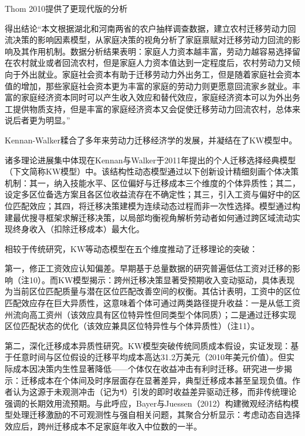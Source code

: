 \documentclass[a4paper,12pt]{article}
\begin{document}
Thom 2010提供了更现代版的分析

\cite{ShiZhiLeiJiaTingBingFuJiaTingJueCeYuNongCunQianYiLaoDongLiHuiLiu2012}得出结论“本文根据湖北和河南两省的农户抽样调查数据，建立农村迁移劳动力回流决策的影响因素模型，从家庭决策的视角分析了家庭禀赋对迁移劳动力回流的影响及其作用机制。数据分析结果表明：家庭人力资本越丰富，劳动力越容易选择留在农村就业或者回流农村，但是家庭人力资本值达到一定程度后，农村劳动力又倾向于外出就业。家庭社会资本有助于迁移劳动力外出务工，但是随着家庭社会资本值的增加，那些家庭社会资本更为丰富的家庭的劳动力则更愿意回流家乡就业。丰富的家庭经济资本同时可以产生收入效应和替代效应，家庭经济资本可以为外出务工提供物质支持，但是丰富的家庭经济资本又会促使迁移劳动力回流农村，总体来说后者更为明显。”

\cite{RenYuanNongCunWaiChuLaoDongLiHuiLiuQianYiDeYingXiangYinSuHeHuiLiuXiaoYing2017}





Kennan-Walker糅合了多年来劳动力迁移经济学的发展，并凝结在了KW模型中。

诸多理论进展集中体现在Kennan与Walker于2011年提出的个人迁移选择经典模型（下文简称KW模型）中。该结构性动态模型通过以下创新设计精细刻画个体决策机制：其一，纳入技能水平、区位偏好与迁移成本三个维度的个体异质性；其二，设定多区位备选方案且各区位收益流存在不确定性；其三，引入工资与偏好中的区位匹配效应；其四，将迁移决策建模为连续动态过程而非一次性选择。模型通过构建最优搜寻框架求解迁移决策，以局部均衡视角解析劳动者如何通过跨区域流动实现终身收入（扣除迁移成本）最大化。

相较于传统研究，KW等动态模型在五个维度推动了迁移理论的突破：

第一，修正工资效应认知偏差。早期基于总量数据的研究普遍低估工资对迁移的影响（注10）。而KW模型揭示：跨州迁移决策显著受预期收入变动驱动，具体表现为当前区位匹配质量与潜在区位匹配改善空间的权衡。其估计表明，工资中的区位匹配效应存在巨大异质性，这意味着个体可通过两类路径提升收益：一是从低工资州流向高工资州（该效应具有区位特异性但同类型个体同质）；二是通过迁移实现区位匹配状态的优化（该效应兼具区位特异性与个体异质性）（注11）。

第二，深化迁移成本异质性研究。KW模型突破传统同质成本假设，实证发现：基于任意时间与区位假设的迁移平均成本高达31.2万美元（2010年美元价值）。但实际成本因决策内生性显著降低——个体仅在收益冲击有利时迁移。研究进一步揭示：迁移成本在个体间及时序层面存在显著差异，典型迁移成本甚至呈现负值。作者认为这源于未观测冲击（记为ߞ）引发的即时收益差异驱动迁移，而非传统理论强调的长期效用流预期。与此呼应，Bayer与Juessen（2012）构建微观经济结构模型处理迁移激励的不可观测性与强自相关问题，其聚合分析显示：考虑动态自选择效应后，跨州迁移成本不足家庭年收入中位数的一半。
\end{document}

